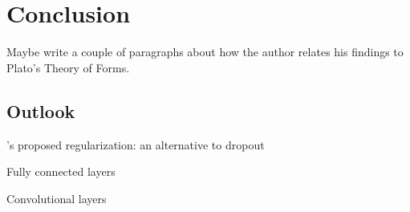 \section{Conclusion}

Maybe write a couple of paragraphs about how the author relates his findings to Plato's Theory of Forms.

\subsection{Outlook}

\citet{owhadi20}'s proposed regularization: an alternative to dropout

Fully connected layers

Convolutional layers